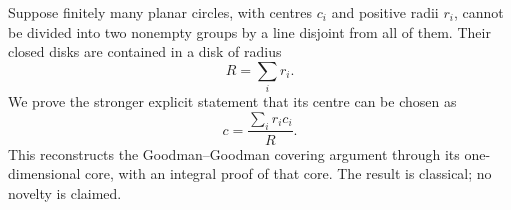 Suppose finitely many planar circles, with centres $c_i$ and positive radii $r_i$, cannot be divided into two nonempty groups by a line disjoint from all of them. Their closed disks are contained in a disk of radius
\[
 R=\sum_i r_i.
\]
We prove the stronger explicit statement that its centre can be chosen as
\[
 c=\frac{\sum_i r_i c_i}{R}.
\]
This reconstructs the Goodman--Goodman covering argument through its one-dimensional core, with an integral proof of that core. The result is classical; no novelty is claimed.
